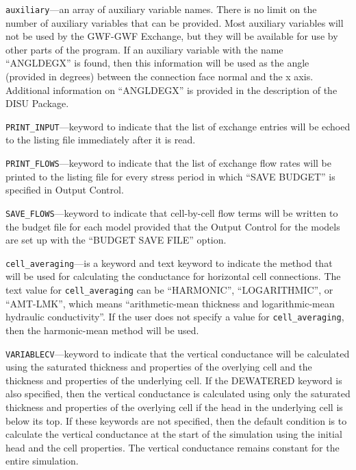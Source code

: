 
\item \texttt{auxiliary}---an array of auxiliary variable names.  There is no limit on the number of auxiliary variables that can be provided. Most auxiliary variables will not be used by the GWF-GWF Exchange, but they will be available for use by other parts of the program.  If an auxiliary variable with the name ``ANGLDEGX'' is found, then this information will be used as the angle (provided in degrees) between the connection face normal and the x axis.  Additional information on ``ANGLDEGX'' is provided in the description of the DISU Package.

\item \texttt{PRINT\_INPUT}---keyword to indicate that the list of exchange entries will be echoed to the listing file immediately after it is read.

\item \texttt{PRINT\_FLOWS}---keyword to indicate that the list of exchange flow rates will be printed to the listing file for every stress period in which ``SAVE BUDGET'' is specified in Output Control.

\item \texttt{SAVE\_FLOWS}---keyword to indicate that cell-by-cell flow terms will be written to the budget file for each model provided that the Output Control for the models are set up with the ``BUDGET SAVE FILE'' option.

\item \texttt{cell\_averaging}---is a keyword and text keyword to indicate the method that will be used for calculating the conductance for horizontal cell connections.  The text value for \texttt{cell\_averaging} can be ``HARMONIC'', ``LOGARITHMIC'', or ``AMT-LMK'', which means ``arithmetic-mean thickness and logarithmic-mean hydraulic conductivity''. If the user does not specify a value for \texttt{cell\_averaging}, then the harmonic-mean method will be used.

\item \texttt{VARIABLECV}---keyword to indicate that the vertical conductance will be calculated using the saturated thickness and properties of the overlying cell and the thickness and properties of the underlying cell.  If the DEWATERED keyword is also specified, then the vertical conductance is calculated using only the saturated thickness and properties of the overlying cell if the head in the underlying cell is below its top.  If these keywords are not specified, then the default condition is to calculate the vertical conductance at the start of the simulation using the initial head and the cell properties.  The vertical conductance remains constant for the entire simulation.

